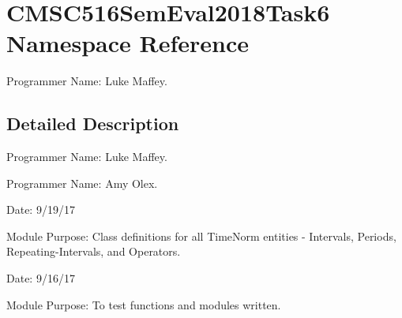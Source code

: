 \hypertarget{namespaceCMSC516SemEval2018Task6}{}\section{C\+M\+S\+C516\+Sem\+Eval2018\+Task6 Namespace Reference}
\label{namespaceCMSC516SemEval2018Task6}


Programmer Name\+: Luke Maffey.  




\subsection{Detailed Description}
Programmer Name\+: Luke Maffey. 

Programmer Name\+: Amy Olex.

Date\+: 9/19/17

Module Purpose\+: Class definitions for all Time\+Norm entities -\/ Intervals, Periods, Repeating-\/\+Intervals, and Operators.

Date\+: 9/16/17

Module Purpose\+: To test functions and modules written. 